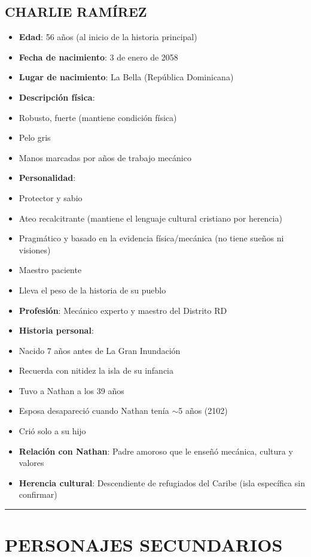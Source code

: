\documentclass[11pt,a4paper]{report}
\begin{document}
\subsection{CHARLIE RAMÍREZ}
\begin{itemize}
  \item \textbf{Edad}: 56 años (al inicio de la historia principal)
  \item \textbf{Fecha de nacimiento}: 3 de enero de 2058
  \item \textbf{Lugar de nacimiento}: La Bella (República Dominicana)
  \item \textbf{Descripción física}: 
  \item Robusto, fuerte (mantiene condición física)
  \item Pelo gris
  \item Manos marcadas por años de trabajo mecánico
  \item \textbf{Personalidad}:
  \item Protector y sabio
  \item Ateo recalcitrante (mantiene el lenguaje cultural cristiano por herencia)
  \item Pragmático y basado en la evidencia física/mecánica (no tiene sueños ni visiones)
  \item Maestro paciente
  \item Lleva el peso de la historia de su pueblo
  \item \textbf{Profesión}: Mecánico experto y maestro del Distrito RD
  \item \textbf{Historia personal}:
  \item Nacido 7 años antes de La Gran Inundación
  \item Recuerda con nitidez la isla de su infancia
  \item Tuvo a Nathan a los 39 años
  \item Esposa desapareció cuando Nathan tenía $\sim$5 años (2102)
  \item Crió solo a su hijo
  \item \textbf{Relación con Nathan}: Padre amoroso que le enseñó mecánica, cultura y valores
  \item \textbf{Herencia cultural}: Descendiente de refugiados del Caribe (isla específica sin confirmar)

\end{itemize}
\bigskip\hrule\bigskip

\section{PERSONAJES SECUNDARIOS}
\end{document}
